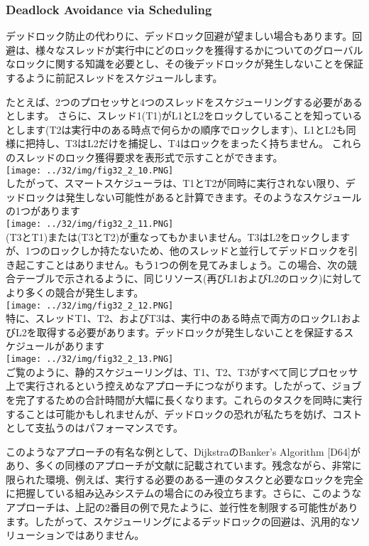 \hypertarget{deadlock-avoidance-via-scheduling}{%
\subsubsection*{Deadlock Avoidance via
Scheduling}\label{deadlock-avoidance-via-scheduling}}

デッドロック防止の代わりに、デッドロック回避が望ましい場合もあります。回避は、様々なスレッドが実行中にどのロックを獲得するかについてのグローバルなロックに関する知識を必要とし、その後デッドロックが発生しないことを保証するように前記スレッドをスケジュールします。

たとえば、2つのプロセッサと4つのスレッドをスケジューリングする必要があるとします。
さらに、スレッド1(T1)がL1とL2をロックしていることを知っているとします(T2は実行中のある時点で何らかの順序でロックします)、L1とL2も同様に把持し、T3はL2だけを捕捉し、T4はロックをまったく持ちません。
これらのスレッドのロック獲得要求を表形式で示すことができます。\\
\texttt{[image: ../32/img/fig32\_2\_10.PNG]}\\
したがって、スマートスケジューラは、T1とT2が同時に実行されない限り、デッドロックは発生しない可能性があると計算できます。そのようなスケジュールの1つがあります\\
\texttt{[image: ../32/img/fig32\_2\_11.PNG]}\\
(T3とT1)または(T3とT2)が重なってもかまいません。T3はL2をロックしますが、1つのロックしか持たないため、他のスレッドと並行してデッドロックを引き起こすことはありません。もう1つの例を見てみましょう。この場合、次の競合テーブルで示されるように、同じリソース(再びL1およびL2のロック)に対してより多くの競合が発生します。\\
\texttt{[image: ../32/img/fig32\_2\_12.PNG]}\\
特に、スレッドT1、T2、およびT3は、実行中のある時点で両方のロックL1およびL2を取得する必要があります。デッドロックが発生しないことを保証するスケジュールがあります\\
\texttt{[image: ../32/img/fig32\_2\_13.PNG]}\\
ご覧のように、静的スケジューリングは、T1、T2、T3がすべて同じプロセッサ上で実行されるという控えめなアプローチにつながります。したがって、ジョブを完了するための合計時間が大幅に長くなります。これらのタスクを同時に実行することは可能かもしれませんが、デッドロックの恐れが私たちを妨げ、コストとして支払うのはパフォーマンスです。

このようなアプローチの有名な例として、DijkstraのBanker's Algorithm
{[}D64{]}があり、多くの同様のアプローチが文献に記載されています。残念ながら、非常に限られた環境、例えば、実行する必要のある一連のタスクと必要なロックを完全に把握している組み込みシステムの場合にのみ役立ちます。さらに、このようなアプローチは、上記の2番目の例で見たように、並行性を制限する可能性があります。したがって、スケジューリングによるデッドロックの回避は、汎用的なソリューションではありません。

